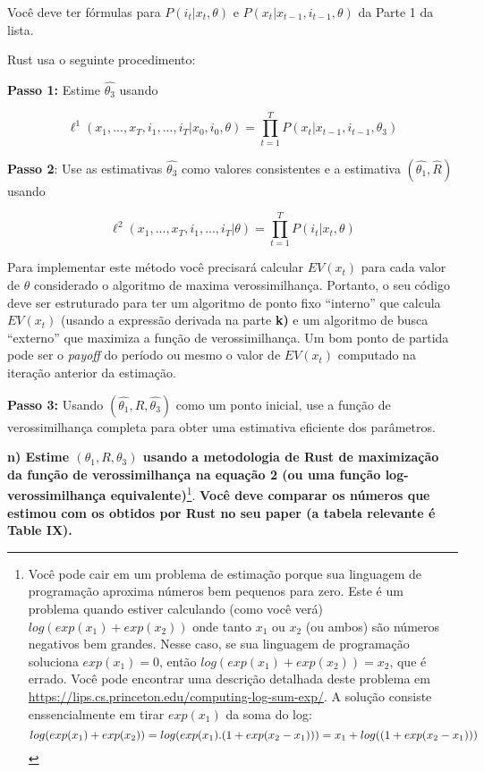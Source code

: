 \documentclass[12pt,a4paper]{article}
\let\rmarkdownfootnote\footnote%
\def\footnote{\protect\rmarkdownfootnote}
\begin{document}
Você deve ter fórmulas para \(P(i_t|x_t,\theta)\) e
\(P(x_t|x_{t-1},i_{t-1},\theta)\) da Parte 1 da lista.

Rust usa o seguinte procedimento:

\textbf{Passo 1:} Estime \(\hat{\theta_3}\) usando

\[
\ell^1 (x_1,...,x_T,i_1,...,i_T|x_0,i_0,\theta) = \prod_{t=1}^T P(x_t|x_{t-1},i_{t-1},\theta_3)
\]

\textbf{Passo 2}: Use as estimativas \(\hat{\theta_3}\) como valores
consistentes e a estimativa \((\hat{\theta_1},\hat{R})\) usando

\[
\ell^2 (x_1,...,x_T,i_1,...,i_T|\theta)= \prod_{t=1}^T P(i_t|x_t,\theta)
\]

Para implementar este método você precisará calcular \(EV(x_t)\) para
cada valor de \(\theta\) considerado o algoritmo de maxima
verossimilhança. Portanto, o seu código deve ser estruturado para ter um
algoritmo de ponto fixo ``interno'' que calcula \(EV(x_t)\) (usando a
expressão derivada na parte \textbf{k)} e um algoritmo de busca
``externo'' que maximiza a função de verossimilhança. Um bom ponto de
partida pode ser o \emph{payoff} do período ou mesmo o valor de
\(EV(x_t)\) computado na iteração anterior da estimação.

\textbf{Passo 3:} Usando \((\hat{\theta_1},\hat{R},\hat{\theta_3})\)
como um ponto inicial, use a função de verossimilhança completa para
obter uma estimativa eficiente dos parâmetros.

\textbf{n) Estime \((\theta_1, R,\theta_3)\) usando a metodologia de
Rust de maximização da função de verossimilhança na equação 2 (ou uma
função log-verossimilhança equivalente)}\footnote{Você pode cair em um
  problema de estimação porque sua linguagem de programação aproxima
  números bem pequenos para zero. Este é um problema quando estiver
  calculando (como você verá) \(log(exp(x_1) + exp(x_2))\) onde tanto
  \(x_1\) ou \(x_2\) (ou ambos) são números negativos bem grandes. Nesse
  caso, se sua linguagem de programação soluciona \(exp(x_1)= 0\), então
  \(log(exp(x_1) + exp(x_2))=x_2\), que é errado. Você pode encontrar
  uma descrição detalhada deste problema em
  \url{https://lips.cs.princeton.edu/computing-log-sum-exp/}. A solução
  consiste enssencialmente em tirar \(exp (x_1)\) da soma do log: \[
  log(exp(x_1) + exp(x_2))= log (exp(x_1).(1 + exp (x_2 - x_1))) \\
  = x_1 + log((1+exp(x_2-x_1)))
  \]}. \textbf{Você deve comparar os números que estimou com os obtidos
por Rust no seu paper (a tabela relevante é Table IX).}
\end{document}
